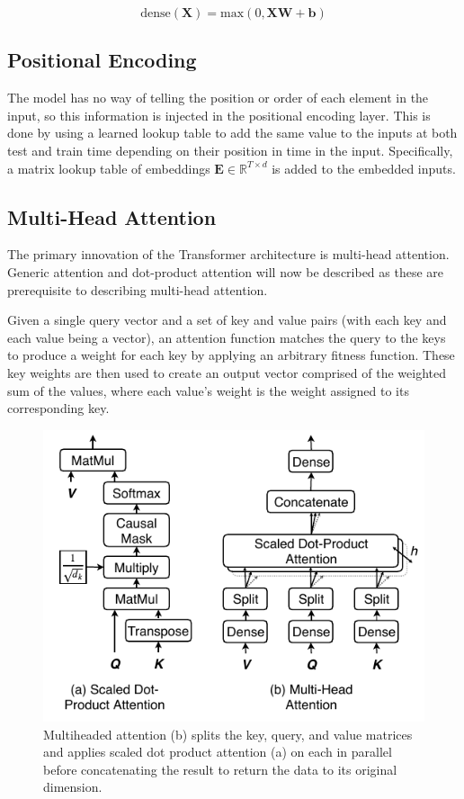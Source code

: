 \begin{equation} \label{dense_layer}
\text{dense}(\boldsymbol{X}) = \text{max}(0, \boldsymbol{XW} + \boldsymbol{b})
\end{equation}

\subsection{Positional Encoding}
The model has no way of telling the position or order of each element in the input, so this information is injected in the positional encoding layer.
This is done by using a learned lookup table to add the same value to the inputs at both test and train time depending on their position in time in the input.
Specifically, a matrix lookup table of embeddings $\boldsymbol{E} \in \mathbb{R}^{T \times d}$ is added to the embedded inputs.

\subsection{Multi-Head Attention} \label{multihead_attention}
The primary innovation of the Transformer architecture is multi-head attention.
Generic attention and dot-product attention will now be described as these are prerequisite to describing multi-head attention.

Given a single query vector and a set of key and value pairs (with each key and each value being a vector), an attention function matches the query to the keys to produce a weight for each key by applying an arbitrary fitness function.
These key weights are then used to create an output vector comprised of the weighted sum of the values, where each value's weight is the weight assigned to its corresponding key. 

\begin{figure}[htbp]
	\centerline{\includegraphics[width=.35\textwidth]{images/multihead_attn.pdf}}
	\caption{Multiheaded attention (b) splits the key, query, and value matrices and applies scaled dot product attention (a) on each in parallel before concatenating the result to return the data to its original dimension.}
	\label{fig:multihead}
\end{figure}

